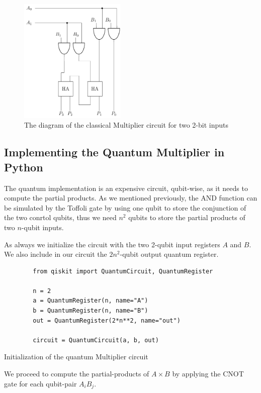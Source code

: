 \begin{figure}[ht]
    \centering
    \includegraphics[height=6cm]{images/5_Implementation/classical_2bit_multiplier.pdf}
    \caption{The diagram of the classical Multiplier circuit for two 2-bit inputs}
\end{figure}

\subsection{Implementing the Quantum Multiplier in Python}

The quantum implementation is an expensive circuit, qubit-wise, as it needs to compute the
partial products. As we mentioned previously, the AND function can be simulated by the Toffoli gate
by using one  qubit to store the conjunction of the two conrtol qubits, thus we
need $n^2$ qubits to store the partial products of two $n$-qubit inputs.

As always we initialize the circuit with the two 2-qubit input registers $A$ and $B$. We also
include in our circuit the $2n^2$-qubit output quantum register.

\begin{listing}[ht]
    \centering
    \begin{verbatim}
        from qiskit import QuantumCircuit, QuantumRegister

        n = 2
        a = QuantumRegister(n, name="A")
        b = QuantumRegister(n, name="B")
        out = QuantumRegister(2*n**2, name="out")

        circuit = QuantumCircuit(a, b, out)
    \end{verbatim}
    \caption{Initialization of the quantum Multiplier circuit}
\end{listing}

We proceed to compute the partial-products of $A \times B$ by applying the CNOT gate for each
qubit-pair $A_iB_j$.

